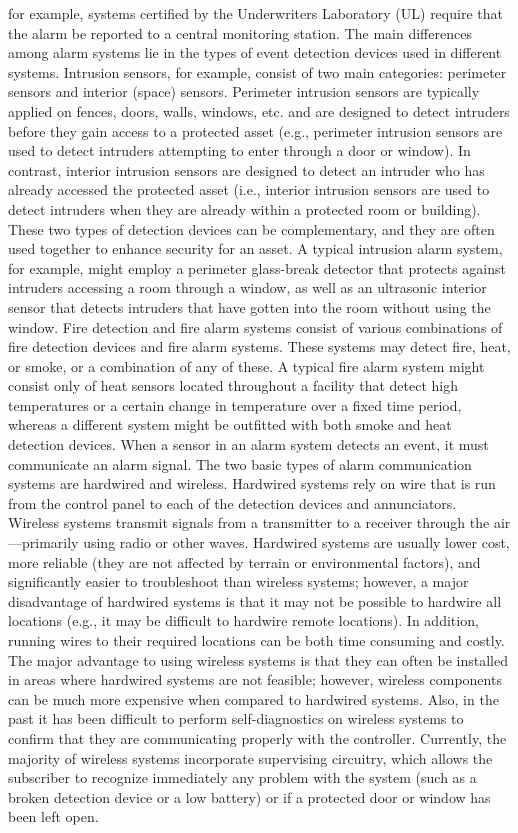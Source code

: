 \documentclass{article}
\begin{document}
for example, systems certified by the Underwriters Laboratory (UL)
require that the alarm be reported to a central monitoring station. The
main differences among alarm systems lie in the types of event detection
devices used in different systems. Intrusion sensors, for example,
consist of two main categories: perimeter sensors and interior (space)
sensors. Perimeter intrusion sensors are typically applied on fences,
doors, walls, windows, etc. and are designed to detect intruders before
they gain access to a protected asset (e.g., perimeter intrusion sensors
are used to detect intruders attempting to enter through a door or
window). In contrast, interior intrusion sensors are designed to detect
an intruder who has already accessed the protected asset (i.e., interior
intrusion sensors are used to detect intruders when they are already
within a protected room or building). These two types of detection
devices can be complementary, and they are often used together to
enhance security for an asset. A typical intrusion alarm system, for
example, might employ a perimeter glass-break detector that protects
against intruders accessing a room through a window, as well as an
ultrasonic interior sensor that detects intruders that have gotten into
the room without using the window. Fire detection and fire alarm systems
consist of various combinations of fire detection devices and fire alarm
systems. These systems may detect fire, heat, or smoke, or a combination
of any of these. A typical fire alarm system might consist only of heat
sensors located throughout a facility that detect high temperatures or a
certain change in temperature over a fixed time period, whereas a
different system might be outfitted with both smoke and heat detection
devices. When a sensor in an alarm system detects an event, it must
communicate an alarm signal. The two basic types of alarm communication
systems are hardwired and wireless. Hardwired systems rely on wire that
is run from the control panel to each of the detection devices and
annunciators. Wireless systems transmit signals from a transmitter to a
receiver through the air---primarily using radio or other waves.
Hardwired systems are usually lower cost, more reliable (they are not
affected by terrain or environmental factors), and significantly easier
to troubleshoot than wireless systems; however, a major disadvantage of
hardwired systems is that it may not be possible to hardwire all
locations (e.g., it may be difficult to hardwire remote locations). In
addition, running wires to their required locations can be both time
consuming and costly. The major advantage to using wireless systems is
that they can often be installed in areas where hardwired systems are
not feasible; however, wireless components can be much more expensive
when compared to hardwired systems. Also, in the past it has been
difficult to perform self-diagnostics on wireless systems to confirm
that they are communicating properly with the controller. Currently, the
majority of wireless systems incorporate supervising circuitry, which
allows the subscriber to recognize immediately any problem with the
system (such as a broken detection device or a low battery) or if a
protected door or window has been left open.
\end{document}
